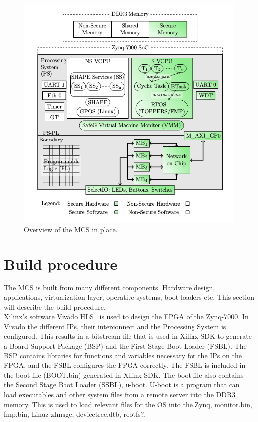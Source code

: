 \begin{figure}[H]
\centering
\includegraphics[width=\textwidth]{./img/literature_overview.png}
\caption{Overview of the MCS in place.\cite{zaki2016}}\label{fig:system_overview}
\end{figure}

\section{Build procedure}
The MCS is built from many different components. Hardware design,  applications, virtualization layer, operative systems, boot loaders etc. This section will describe the build procedure.\\ %

Xilinx's software Vivado HLS~\cite{website:vivado} is used to design the FPGA of the Zynq-7000. In Vivado the different IPs, their interconnect and the Processing System is configured. This results in a bitstream file that is used in Xilinx SDK to generate a Board Support Package (BSP) and the First Stage Boot Loader (FSBL). The BSP contains libraries for functions and variables necessary for the IPs on the FPGA, and the FSBL configures the FPGA correctly. The FSBL is included in the boot file (BOOT.bin) generated in Xilinx SDK. The boot file also contains the Second Stage Boot Loader (SSBL), u-boot. U-boot is a program that can load executables and other system files from a remote server into the DDR3 memory. This is used to load relevant files for the OS into the Zynq, monitor.bin, fmp.bin, Linuz zImage, devicetree.dtb, rootfs?.

